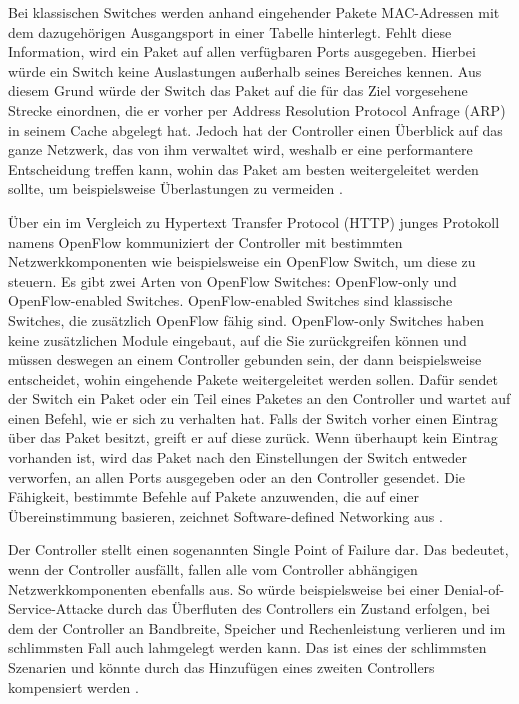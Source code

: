 \documentclass[fontsize=12pt,paper=a4,open=any,parskip=half,
  twoside=false,toc=listof,toc=bibliography,fleqn,leqno,
  captions=nooneline,captions=tableabove,british]{scrbook}
\begin{document}
Bei klassischen Switches werden anhand eingehender Pakete MAC-Adressen mit dem dazugehörigen Ausgangsport in einer Tabelle hinterlegt. Fehlt diese Information, wird ein Paket auf allen verfügbaren Ports ausgegeben. Hierbei würde ein Switch keine Auslastungen außerhalb seines Bereiches kennen. Aus diesem Grund würde der Switch das Paket auf die für das Ziel vorgesehene Strecke einordnen, die er vorher per Address Resolution Protocol Anfrage (ARP) in seinem Cache abgelegt hat. Jedoch hat der Controller einen Überblick auf das ganze Netzwerk, das von ihm verwaltet wird, weshalb er eine performantere Entscheidung treffen kann, wohin das Paket am besten weitergeleitet werden sollte, um beispielsweise Überlastungen zu vermeiden \cite[1-2]{sdn1}. \par
Über ein im Vergleich zu Hypertext Transfer Protocol (HTTP) junges Protokoll namens OpenFlow kommuniziert der Controller mit bestimmten Netzwerkkomponenten wie beispielsweise ein OpenFlow Switch, um diese zu steuern. Es gibt zwei Arten von OpenFlow Switches: OpenFlow-only und OpenFlow-enabled Switches. OpenFlow-enabled Switches sind klassische Switches, die zusätzlich OpenFlow fähig sind. OpenFlow-only Switches haben keine zusätzlichen Module eingebaut, auf die Sie zurückgreifen können und müssen deswegen an einem Controller gebunden sein, der dann beispielsweise entscheidet, wohin eingehende Pakete weitergeleitet werden sollen. Dafür sendet der Switch ein Paket oder ein Teil eines Paketes an den Controller und wartet auf einen Befehl, wie er sich zu verhalten hat. Falls der Switch vorher einen Eintrag über das Paket besitzt, greift er auf diese zurück. Wenn überhaupt kein Eintrag vorhanden ist, wird das Paket nach den Einstellungen der Switch entweder verworfen, an allen Ports ausgegeben oder an den Controller gesendet. Die Fähigkeit, bestimmte Befehle auf Pakete anzuwenden, die auf einer Übereinstimmung basieren, zeichnet Software-defined Networking aus \cite[9-10]{sdn2}. \par
Der Controller stellt einen sogenannten Single Point of Failure dar. Das bedeutet, wenn der Controller ausfällt, fallen alle vom Controller abhängigen Netzwerkkomponenten ebenfalls aus. So würde beispielsweise bei einer Denial-of-Service-Attacke durch das Überfluten des Controllers ein Zustand erfolgen, bei dem der Controller an Bandbreite, Speicher und Rechenleistung verlieren und im schlimmsten Fall auch lahmgelegt werden kann. Das ist eines der schlimmsten Szenarien und könnte durch das Hinzufügen eines zweiten Controllers kompensiert werden \cite[3]{sdn3}.
\end{document}
